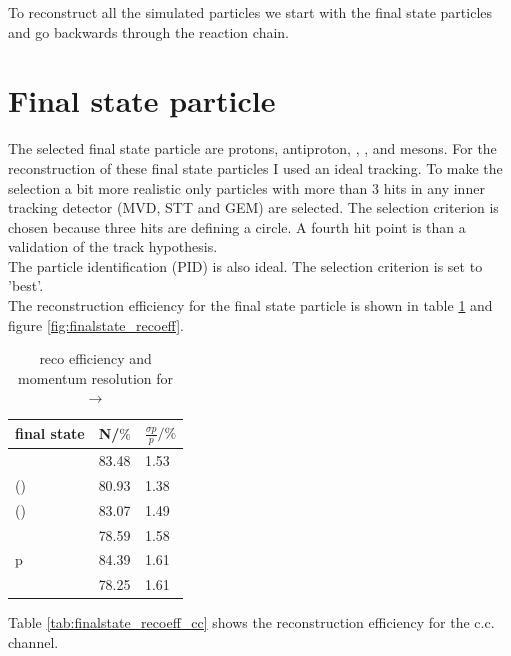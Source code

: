 To reconstruct all the simulated particles we start with the final state particles and go backwards through the reaction chain.

\section{Final state particle}
	The selected final state particle are protons, antiproton, \piminus, \piplus, \kminus and \kplus mesons.
	For the reconstruction of these final state particles I used an ideal tracking. 
	To make the selection a bit more realistic only particles with more than 3 hits in any inner tracking detector (MVD, STT and GEM)
	are selected.
	The selection criterion is chosen because three hits are defining a circle.
	A fourth hit point is than a validation of the track hypothesis.\\
	The particle identification (PID) is also ideal. 
	The selection criterion is set to 'best'.\vspace{11pt} \\
	The reconstruction  efficiency for the final state particle is shown in table \ref{tab:finalstate_recoeff} and figure \ref{fig:finalstate_recoeff}.
	
	\begin{table}
		\centering
		\caption{\propose reco efficiency and momentum resolution for \pbarpSystem $\rightarrow$ \excitedcascade \anticascade}
		\label{tab:finalstate_recoeff}
		\begin{tabular}{lll}
			\hline
			final state & N/$\%$ & $\frac{\sigma p}{p}/\%$ \\
			\hline
			\hline
			\piminus & 83.48 & 1.53\\
			\piplusone(\anticascade) &  80.93& 1.38 \\
			\piplustwo(\alam) &  83.07& 1.49\\
			\kminus&  78.59& 1.58\\
			p &  84.39& 1.61\\
			\antiproton & 78.25 & 1.61\\\hline
			 
		\end{tabular}
	\end{table}
	
	Table \ref{tab:finalstate_recoeff_cc} shows the reconstruction efficiency for the c.c. channel.
	
